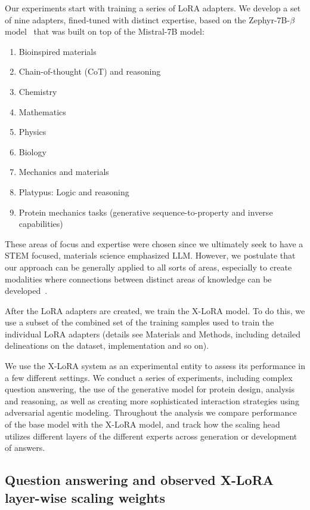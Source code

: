 \documentclass{article}
\begin{document}
Our experiments start with training a series of LoRA adapters. We develop a set of nine adapters, fined-tuned with distinct expertise, based on the Zephyr-7B-$\beta$ model~\cite{HuggingFaceH4/zephyr-7b-betaFace} that was built on top of the Mistral-7B model\cite{Jiang2023Mistral7B}:
\begin{enumerate}
    \item Bioinspired materials 
    \item Chain-of-thought (CoT) and reasoning 
    \item Chemistry
    \item Mathematics
    \item Physics
    \item Biology
    \item Mechanics and materials
    \item Platypus: Logic and reasoning 
    \item Protein mechanics tasks (generative sequence-to-property and inverse capabilities)
\end{enumerate}
These areas of focus and expertise were chosen since we ultimately seek to have a STEM focused, materials science emphasized LLM. However, we postulate that our approach can be generally applied to all sorts of areas, especially to create modalities where connections between distinct areas of knowledge can be developed~\cite{Buehler2023MechGPTModalities,Buehler2023MeLMProblemsb}. 

After the LoRA adapters are created, we train the X-LoRA model. To do this, we use a subset of the combined set of the training samples used to train the individual LoRA adapters (details see Materials and Methods, including detailed delineations on the dataset, implementation and so on). 


We use the X-LoRA system as an experimental entity to assess its performance in a few different settings. We conduct a series of experiments, including complex question answering, the use of the generative model for protein design, analysis and reasoning, as well as creating more sophisticated interaction strategies using adversarial agentic modeling. Throughout the analysis we compare performance of the base model with the X-LoRA model, and track how the scaling head utilizes different layers of the different experts across generation or development of answers. 

\subsection{Question answering and observed X-LoRA layer-wise scaling weights}
\end{document}
